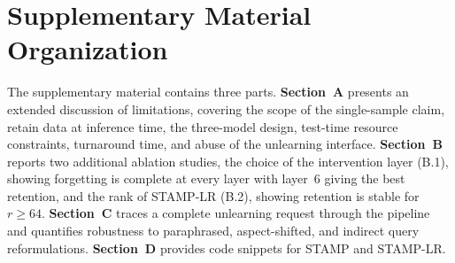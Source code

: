 \section{Supplementary Material Organization}
The supplementary material contains three parts. \textbf{Section~A} presents an extended discussion of limitations, covering the scope of the single-sample claim, retain data at inference time, the three-model design, test-time resource constraints, turnaround time, and abuse of the unlearning interface. \textbf{Section~B} reports two additional ablation studies, the choice of the intervention layer (B.1), showing forgetting is complete at every layer with layer~6 giving the best retention, and the rank of STAMP-LR (B.2), showing retention is stable for $r \geq 64$. \textbf{Section~C} traces a complete unlearning request through the pipeline and quantifies robustness to paraphrased, aspect-shifted, and indirect query reformulations. \textbf{Section~D} provides code snippets for STAMP and STAMP-LR.
